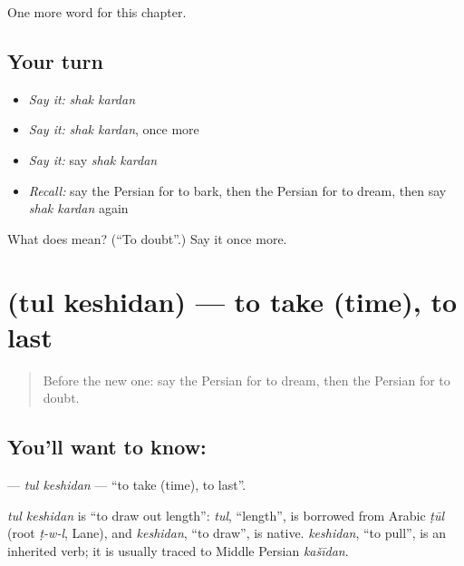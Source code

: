\begin{grammarlens}[title={What you've built}]
One more word for this chapter.
\end{grammarlens}

\subsection*{Your turn}
\begin{itemize}
\raggedright
  \item \emph{Say it:} \emph{shak kardan}
  \item \emph{Say it:} \emph{shak kardan}, once more
  \item \emph{Say it:} say \emph{shak kardan}
  \item \emph{Recall:} say the Persian for to bark, then the Persian for to dream, then say \emph{shak kardan} again
\end{itemize}

\begin{tcolorbox}[breakable,colback=teal!4,colframe=teal!35!black,title={Before you move on}]
What does   mean? (\textquotedblleft{}To doubt\textquotedblright{}.) Say it once more.
\end{tcolorbox}
\section[\texorpdfstring{\fa{طول} \fa{کشیدن} (tul keshidan)}{طول کشیدن (tul keshidan)}]{  (tul keshidan) — to take (time), to last}

\label{lesson:FA-C222-tul-keshidan}



\begin{quote}
Before the new one: say the Persian for to dream, then the Persian for to doubt.
\end{quote}

\subsection*{You'll want to know:  }
\textbf{ } — \emph{tul keshidan} — \textquotedblleft{}to take (time), to last\textquotedblright{}.

\begin{cousinweb}
\emph{tul keshidan} is \textquotedblleft{}to draw out length\textquotedblright{}: \emph{tul}, \textquotedblleft{}length\textquotedblright{}, is borrowed from Arabic \emph{ṭūl} (root \emph{ṭ-w-l}, Lane), and \emph{keshidan}, \textquotedblleft{}to draw\textquotedblright{}, is native. \emph{keshidan}, \textquotedblleft{}to pull\textquotedblright{}, is an inherited verb; it is usually traced to Middle Persian \emph{kašīdan}.
\end{cousinweb}

